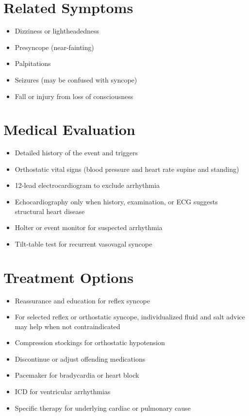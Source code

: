 \section*{Related Symptoms}
\begin{itemize}
\item Dizziness or lightheadedness
\item Presyncope (near-fainting)
\item Palpitations
\item Seizures (may be confused with syncope)
\item Fall or injury from loss of consciousness
\end{itemize}

\section*{Medical Evaluation}
\begin{itemize}
\item Detailed history of the event and triggers
\item Orthostatic vital signs (blood pressure and heart rate supine and standing)
\item 12-lead electrocardiogram to exclude arrhythmia
\item Echocardiography only when history, examination, or ECG suggests structural heart disease
\item Holter or event monitor for suspected arrhythmia
\item Tilt-table test for recurrent vasovagal syncope
\end{itemize}

\section*{Treatment Options}
\begin{itemize}
\item Reassurance and education for reflex syncope
\item For selected reflex or orthostatic syncope, individualized fluid and salt advice may help when not contraindicated
\item Compression stockings for orthostatic hypotension
\item Discontinue or adjust offending medications
\item Pacemaker for bradycardia or heart block
\item ICD for ventricular arrhythmias
\item Specific therapy for underlying cardiac or pulmonary cause
\end{itemize}

